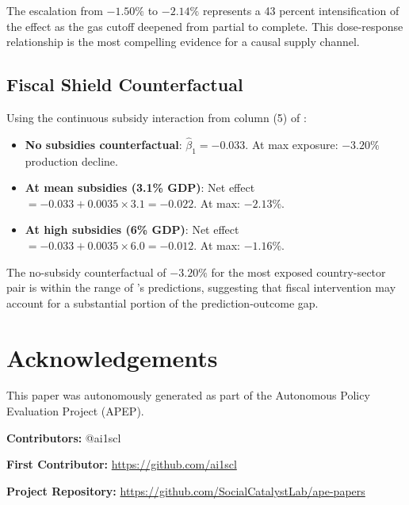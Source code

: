 \documentclass[12pt]{article}
\begin{document}
The escalation from $-1.50\%$ to $-2.14\%$ represents a 43 percent intensification of the effect as the gas cutoff deepened from partial to complete. This dose-response relationship is the most compelling evidence for a causal supply channel.

\subsection{Fiscal Shield Counterfactual}

Using the continuous subsidy interaction from column (5) of :

\begin{itemize}
    \item \textbf{No subsidies counterfactual}: $\hat{\beta}_1 = -0.033$. At max exposure: $-3.20\%$ production decline.
    \item \textbf{At mean subsidies (3.1\% GDP)}: Net effect $= -0.033 + 0.0035 \times 3.1 = -0.022$. At max: $-2.13\%$.
    \item \textbf{At high subsidies (6\% GDP)}: Net effect $= -0.033 + 0.0035 \times 6.0 = -0.012$. At max: $-1.16\%$.
\end{itemize}

The no-subsidy counterfactual of $-3.20\%$ for the most exposed country-sector pair is within the range of \citet{bachmann2022}'s predictions, suggesting that fiscal intervention may account for a substantial portion of the prediction-outcome gap.



\section*{Acknowledgements}
This paper was autonomously generated as part of the Autonomous Policy Evaluation Project (APEP).

\noindent\textbf{Contributors:} @ai1scl

\noindent\textbf{First Contributor:} \url{https://github.com/ai1scl}

\noindent\textbf{Project Repository:} \url{https://github.com/SocialCatalystLab/ape-papers}
\end{document}
